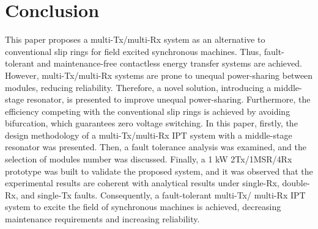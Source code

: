 \documentclass[journal]{IEEEtran}
\begin{document}
\section{Conclusion}
This paper proposes a multi-Tx/multi-Rx system as an alternative to conventional slip rings for field excited synchronous machines. 
Thus, fault-tolerant and maintenance-free contactless energy transfer systems are achieved. 
However, multi-Tx/multi-Rx systems are prone to unequal power-sharing between modules, reducing reliability. 
Therefore, a novel solution, introducing a middle-stage resonator, is presented to improve unequal power-sharing. 
Furthermore, the efficiency competing with the conventional slip rings is achieved by avoiding bifurcation, which guarantees zero voltage switching.
In this paper, firstly, the design methodology of a multi-Tx/multi-Rx IPT system with a middle-stage resonator was presented. 
Then,  a fault tolerance analysis was examined, and the selection of modules number was discussed. 
Finally,  a 1 kW 2Tx/1MSR/4Rx prototype was built to validate the proposed system, and it was observed that the experimental results are coherent with analytical results under single-Rx, double-Rx, and single-Tx faults.
Consequently, a fault-tolerant multi-Tx/ multi-Rx IPT system to excite the field of synchronous machines is achieved, decreasing maintenance requirements and increasing reliability.  
\end{document}
